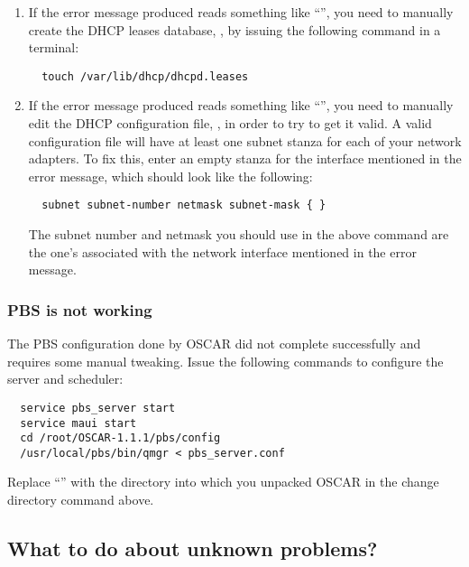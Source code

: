 \begin{enumerate}
\item If the error message produced reads something like
  ``'', you need to manually create
  the DHCP leases database, , by
  issuing the following command in a terminal:

\begin{verbatim}
  touch /var/lib/dhcp/dhcpd.leases
\end{verbatim}
  
\item If the error message produced reads something like ``'', you need to manually edit the DHCP
  configuration file, , in order to try to get
  it valid. A valid configuration file will have at least one subnet
  stanza for each of your network adapters. To fix this, enter an
  empty stanza for the interface mentioned in the error message, which
  should look like the following:

\begin{verbatim}
  subnet subnet-number netmask subnet-mask { }
\end{verbatim}
  
  The subnet number and netmask you should use in the above command
  are the one's associated with the network interface mentioned in the
  error message.
\end{enumerate}

\subsubsection{PBS is not working}

The PBS configuration done by OSCAR did not complete successfully and
requires some manual tweaking. Issue the following commands to
configure the server and scheduler:

\begchange
\begin{verbatim}
  service pbs_server start
  service maui start
  cd /root/OSCAR-1.1.1/pbs/config
  /usr/local/pbs/bin/qmgr < pbs_server.conf
\end{verbatim}

Replace ``'' with the directory into which you unpacked
\endchange
OSCAR in the change directory command above.

\subsection{What to do about unknown problems?}

